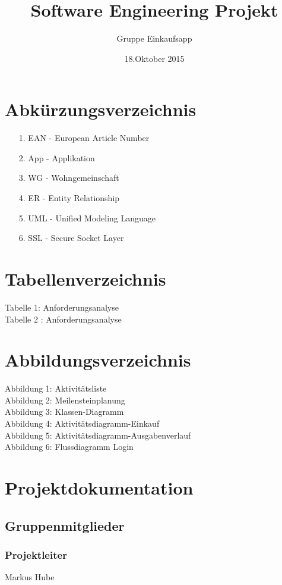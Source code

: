 \documentclass[12pt,a4paper]{article}
\begin{document}
\title{Software Engineering Projekt}
\author{Gruppe Einkaufsapp}
\date {18.Oktober 2015}
\maketitle
\newpage
\tableofcontents
\newpage
\newpage
\section*{Abkürzungsverzeichnis}
\begin{itemize}
\item[1.] EAN - European Article Number
\item[2.] App - Applikation
\item[3.] WG - Wohngemeinschaft
\item[4.] ER - Entity Relationship
\item[5.] UML  - Unified Modeling Language
\item[6.] SSL - Secure Socket Layer 
\end{itemize}
\newpage
\section*{Tabellenverzeichnis}
Tabelle 1: Anforderungsanalyse
\\
Tabelle 2 : Anforderungsanalyse
\newpage
\section*{Abbildungsverzeichnis}
Abbildung 1: Aktivitätsliste
\\
Abbildung 2: Meilensteinplanung
\\
Abbildung 3: Klassen-Diagramm
\\
Abbildung 4: Aktivitätsdiagramm-Einkauf
\\
Abbildung 5: Aktivitätsdiagramm-Ausgabenverlauf
\\
Abbildung 6: Flussdiagramm Login

\newpage
\section*{Projektdokumentation}
\subsection*{Gruppenmitglieder}
\subsubsection*{Projektleiter}
Markus Hube
\end{document}
